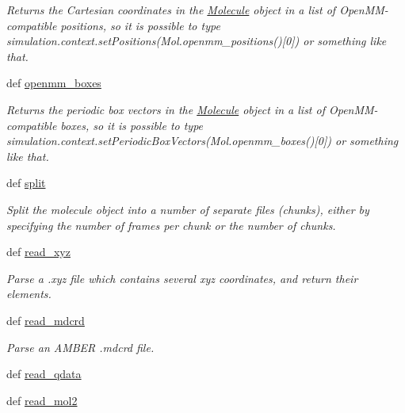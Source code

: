 \begin{DoxyCompactItemize}
\begin{DoxyCompactList}\small\item\em Returns the Cartesian coordinates in the \hyperlink{classforcebalance_1_1molecule_1_1Molecule}{Molecule} object in a list of Open\-M\-M-\/compatible positions, so it is possible to type simulation.\-context.\-set\-Positions(Mol.\-openmm\-\_\-positions()\mbox{[}0\mbox{]}) or something like that. \end{DoxyCompactList}\item 
def \hyperlink{classforcebalance_1_1molecule_1_1Molecule_aa20a420f4b450bfa9e632fae037ecb01}{openmm\-\_\-boxes}
\begin{DoxyCompactList}\small\item\em Returns the periodic box vectors in the \hyperlink{classforcebalance_1_1molecule_1_1Molecule}{Molecule} object in a list of Open\-M\-M-\/compatible boxes, so it is possible to type simulation.\-context.\-set\-Periodic\-Box\-Vectors(Mol.\-openmm\-\_\-boxes()\mbox{[}0\mbox{]}) or something like that. \end{DoxyCompactList}\item 
def \hyperlink{classforcebalance_1_1molecule_1_1Molecule_a71da1c1e530afd8b9b5f08d9bd27259f}{split}
\begin{DoxyCompactList}\small\item\em Split the molecule object into a number of separate files (chunks), either by specifying the number of frames per chunk or the number of chunks. \end{DoxyCompactList}\item 
def \hyperlink{classforcebalance_1_1molecule_1_1Molecule_a15a7a0e0377e6dfd52e60c77fbc583c1}{read\-\_\-xyz}
\begin{DoxyCompactList}\small\item\em Parse a .xyz file which contains several xyz coordinates, and return their elements. \end{DoxyCompactList}\item 
def \hyperlink{classforcebalance_1_1molecule_1_1Molecule_ab1b56d66b7673b2631e2cee013a80b93}{read\-\_\-mdcrd}
\begin{DoxyCompactList}\small\item\em Parse an A\-M\-B\-E\-R .mdcrd file. \end{DoxyCompactList}\item 
def \hyperlink{classforcebalance_1_1molecule_1_1Molecule_a1d34af6a7d22dd34850d58efe8595b20}{read\-\_\-qdata}
\item 
def \hyperlink{classforcebalance_1_1molecule_1_1Molecule_a14b1fbc70a083d21fd016b5dd854fd56}{read\-\_\-mol2}

\end{DoxyCompactItemize}
